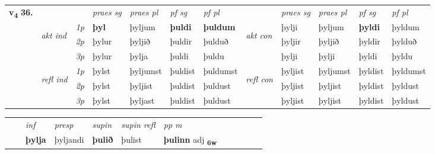 \begin{tabular}{llllllllllll} \toprule
\multirow{4}{*}{{{\textbf{v{\textsubscript{4}}} \Large{\textbf{36.}}}}}  & &   &  \textit{praes sg}  & \textit{praes pl}  &\textit{ pf sg} & \textit{pf pl} &  &  \textit{praes sg}  & \textit{praes pl}  & \textit{pf sg} & \textit{pf pl } \\*
	\cmidrule{4-7} \cmidrule{9-12}
 & \multirow{3}{*}{\begin{turn}{90}\textit{akt ind}\end{turn}} & {\textit{1p}} & \textbf{þyl} & þyljum    & \textbf{þuldi} & \textbf{þuldum} & \multirow{3}{*}{\begin{turn}{90}\textit{akt con}\end{turn}} &þylji & þyljum & \textbf{þyldi} & þyldum\\*
& &  {\textit{2p}} &  þylur  & þyljið   & þuldir & þulduð & & þyljir & þyljið & þyldir & þylduð \\*
& &  {\textit{3p}} & þylur & þylja   & þuldi & þuldu & & þylji & þylji& þyldi & þyldu  \\*
\cmidrule{4-7} \cmidrule{9-12}
 &\multirow{3}{*}{\begin{turn}{90}\textit{refl ind}\end{turn}} & {\textit{1p}} & þylst & þyljumst    & þuldist & þuldumst & \multirow{3}{*}{\begin{turn}{90}\textit{refl con}\end{turn}}  &þyljist & þyljumst & þyldist & þyldumst\\*
 &&  {\textit{2p}} &  þylst  & þyljist   & þuldist & þuldust & &þyljist & þyljist & þyldist & þyldust \\*
& &  {\textit{3p}} & þylst & þyljast   & þuldist & þuldust & & þyljist & þyljist& þyldist & þyldust  \\*
\cmidrule{4-7} \cmidrule{9-12}
\end{tabular}


\begin{tabular}{llllllllllll}
 & & \textit{inf}     & \textit{presp} & \textit{supin} & \textit{supin refl} & \textit{pp m}     \\*
  & & \textbf{þylja}      & þyljandi &  \textbf{þulið} & þulist & \textbf{þulinn} adj \textbf{\textsubscript{6w}} \\*
\cmidrule{1-12}
\end{tabular}



